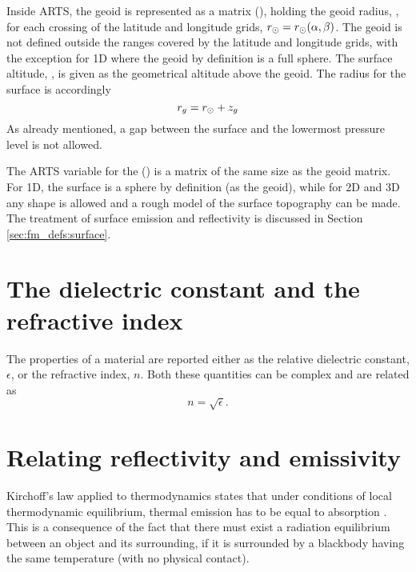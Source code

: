 Inside ARTS, the geoid is represented as a matrix
(), holding the geoid radius, \aRds{\odot}, for
each crossing of the latitude and longitude grids,
$r_{\odot}=r_{\odot}(\alpha,\beta)$. The geoid is not defined
outside the ranges covered by the latitude and longitude grids, with
the exception for 1D where the geoid by definition is a full sphere.
The surface altitude, , is given as the geometrical altitude
above the geoid. The radius for the surface is accordingly
\begin{equation}
  r_{g} = r_{\odot} + z_{g}
 \label{eq:fm_defs:zsurface}
\end{equation}
As already mentioned, a gap between the surface and the 
lowermost pressure level is not allowed.

The ARTS variable for the 
() is a matrix of the same size as the geoid
matrix. For 1D, the surface is a sphere by definition (as the geoid),
while for 2D and 3D any shape is allowed and a rough model of the
surface topography can be made. The treatment of surface emission
and reflectivity is discussed in Section \ref{sec:fm_defs:surface}.




\section{The dielectric constant and the refractive index}
 
 The properties of a material are reported either as the relative
 dielectric constant, $\epsilon$, or the refractive index, $n$. Both
 these quantities can be complex and are related as
 \begin{equation}
   \label{eq:surface_eps2n}
   n = \sqrt{\epsilon}.
 \end{equation}


\section{Relating reflectivity and emissivity}
 \label{sec:surface:surface:ref2emi}
 
 Kirchoff's law applied to thermodynamics states that under conditions
 of local thermodynamic equilibrium, thermal emission has to be equal
 to absorption \citep[page 215]{ulaby:81}. This is a consequence of
 the fact that there must exist a radiation equilibrium between an
 object and its surrounding, if it is surrounded by a blackbody having
 the same temperature (with no physical contact). 
 
